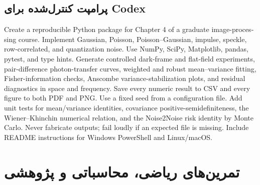 \documentclass[12pt,openany,oneside]{book}
\begin{document}
\subsection{پرامپت کنترل‌شده برای Codex}

\begin{tcolorbox}[colback=CodeGray,colframe=DeepBlue,title={پرامپت پیشنهادی اجرای آزمایش فصل},breakable]
\begin{latin}
Create a reproducible Python package for Chapter 4 of a graduate image-processing course.
Implement Gaussian, Poisson, Poisson--Gaussian, impulse, speckle, row-correlated, and quantization noise.
Use NumPy, SciPy, Matplotlib, pandas, pytest, and type hints. Generate controlled dark-frame and flat-field
experiments, pair-difference photon-transfer curves, weighted and robust mean--variance fitting, Fisher-information
checks, Anscombe variance-stabilization plots, and residual diagnostics in space and frequency. Save every numeric
result to CSV and every figure to both PDF and PNG. Use a fixed seed from a configuration file. Add unit tests for
mean/variance identities, covariance positive-semidefiniteness, the Wiener--Khinchin numerical relation, and the
Noise2Noise risk identity by Monte Carlo. Never fabricate outputs; fail loudly if an expected file is missing.
Include README instructions for Windows PowerShell and Linux/macOS.
\end{latin}
\end{tcolorbox}

\section{تمرین‌های ریاضی، محاسباتی و پژوهشی}
\end{document}
